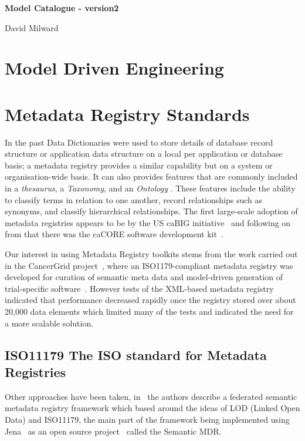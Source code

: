 \documentclass{article}
\begin{document}
 
\bgroup \parindent 0pt
{\Large\textbf{Model Catalogue - version2}}

\vskip 4mm 

{\Large {David Milward}}

\egroup

\vskip 14mm

\noindent

\section{Model Driven Engineering}

\section{Metadata Registry Standards}

In the past Data Dictionaries were used to store details of database record structure or application data structure on a local per application or database basis; a metadata registry provides a similar capability but on a system or organisation-wide basis. It can also provides features that are commonly included in a \emph{thesaurus}, a \emph{Taxonomy}, and an \emph{Ontology} . These features include the ability to classify terms in relation to one another, record relationships such as synonyms, and classify hierarchical relationships. The first large-scale adoption of metadata registries appears to be by the US caBIG initiative~\cite{kunz09} and following on from that there was the caCORE software development kit~\cite{koma08}. 

Our interest in using Metadata Registry toolkits stems from the work carried out in the CancerGrid project~\cite{davi14}, where an ISO1179-compliant metadata registry was developed for curation of semantic meta data and model-driven generation of trial-specific software~\cite{davi12, Abler2011}. However tests of the XML-based metadata registry indicated that performance decreased rapidly once the registry stored over about 20,000 data elements which limited many of the tests and indicated the need for a more scalable solution. 



\subsection{ISO11179 The ISO standard for Metadata Registries}

Other approaches have been taken, in~\cite{Sinaci} the authors describe a federated semantic metadata registry framework which based around the ideas of LOD (Linked Open Data) and ISO11179, the main part of the framework being implemented using Jena~\cite{jena}  as an open source project~\cite{semanticmdr} called the Semantic MDR.
\end{document}
